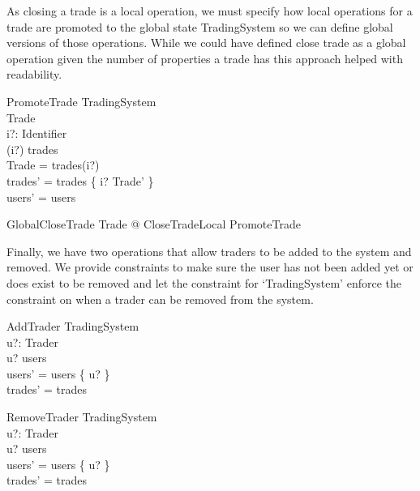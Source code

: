 \documentclass{article}
\begin{document}
\hspace{-0.7cm} As closing a trade is a local operation, we must specify how local operations for a trade are promoted to the global state TradingSystem so we can define global versions of those operations. While we could have defined close trade as a global operation given the number of properties a trade has this approach helped with readability.

\begin{schema}{PromoteTrade}
\Delta TradingSystem \\
\Delta Trade \\
i?: Identifier \\
\where
(i?) \in \dom trades \\
\theta Trade = trades(i?) \\
trades' = trades \oplus \{ i? \mapsto \theta Trade' \} \\
users' = users \\
\end{schema}

\begin{zed}
GlobalCloseTrade  \exists \Delta Trade @ CloseTradeLocal \land PromoteTrade \\
\end{zed}

\vspace{0.2cm}
\hspace{-0.7cm} Finally, we have two operations that allow traders to be added to the system and removed. We provide constraints to make sure the user has not been added yet or does exist to be removed and let the constraint for ‘TradingSystem’ enforce the constraint on when a trader can be removed from the system. 

\begin{schema}{AddTrader}
\Delta TradingSystem \\
u?: Trader \\ 
\where
u? \notin users \\
users' = users \cup \{ u? \} \\
trades' = trades \\
\end{schema}

\begin{schema}{RemoveTrader}
\Delta TradingSystem \\
u?: Trader \\ 
\where
u? \in users \\
users' = users \setminus \{ u? \} \\
trades' = trades \\
\end{schema}
\end{document}
